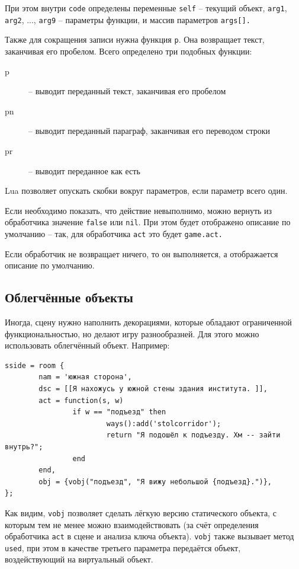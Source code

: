 \documentclass[a4paper,12pt]{article}
\begin{document}
При этом внутри \verb/code/ определены переменные \verb/self/ -- текущий объект, \verb/arg1/, \verb/arg2/, ..., \verb/arg9/ -- параметры функции, и массив параметров \verb/args[]./

Также для сокращения записи нужна функция \verb/p/. Она возвращает текст, заканчивая его пробелом. Всего определено три подобных функции:

\begin{description}
\item[p] -- выводит переданный текст, заканчивая его пробелом
\item[pn] -- выводит переданный параграф, заканчивая его переводом строки
\item[pr] -- выводит переданное как есть
\end{description}

Lua позволяет опускать скобки вокруг параметров, если параметр всего один.

Если необходимо показать, что действие невыполнимо, можно вернуть из обработчика значение \verb/false/ или \verb/nil/. При этом будет отображено описание по умолчанию -- так, для обработчика \verb/act/ это будет  \verb`game.act.`

Если обработчик не возвращает ничего, то он выполняется, а отображается описание по умолчанию.

\subsection{Облегчённые объекты}

Иногда, сцену нужно наполнить декорациями, которые обладают ограниченной функциональностью, но делают игру разнообразней. Для этого можно использовать облегчённый объект. Например:

\begin{verbatim}
sside = room {
        nam = 'южная сторона',
        dsc = [[Я нахожусь у южной стены здания института. ]],
        act = function(s, w)
                if w == "подъезд" then
                        ways():add('stolcorridor');
                        return "Я подошёл к подъезду. Хм -- зайти внутрь?";
                end
        end,
        obj = {vobj("подъезд", "Я вижу небольшой {подъезд}.")},
};
\end{verbatim}

Как видим, \verb/vobj/ позволяет сделать лёгкую версию статического объекта, с которым тем не менее можно взаимодействовать (за счёт определения обработчика \verb/act/ в сцене и анализа ключа объекта). \verb/vobj/ также вызывает метод \verb/used/, при этом в качестве третьего параметра передаётся объект, воздействующий на виртуальный объект.
\end{document}
